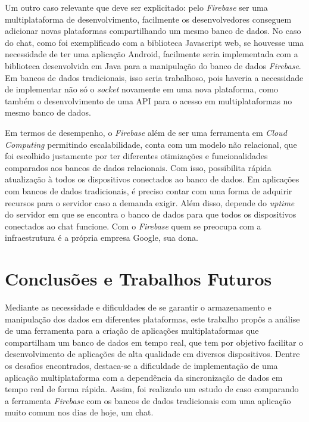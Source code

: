 \documentclass[12pt]{article}
\begin{document}
Um outro caso relevante que deve ser explicitado: pelo \textit{Firebase} ser uma multiplataforma de desenvolvimento, facilmente os desenvolvedores conseguem adicionar novas plataformas compartilhando um mesmo banco de dados. No caso do chat, como foi exemplificado com a biblioteca Javascript web, se houvesse uma necessidade de ter uma aplicação Android, facilmente seria implementada com a biblioteca desenvolvida em Java para a manipulação do banco de dados \textit{Firebase}. Em bancos de dados tradicionais, isso seria trabalhoso, pois haveria a necessidade de implementar não só o \textit{socket} novamente em uma nova plataforma, como também o desenvolvimento de uma API para o acesso em multiplataformas no mesmo banco de dados.

Em termos de desempenho, o \textit{Firebase} além de ser uma ferramenta em \textit{Cloud Computing} permitindo escalabilidade, conta com um modelo não relacional, que foi escolhido justamente por ter diferentes otimizações e funcionalidades comparados aos bancos de dados relacionais. Com isso, possibilita rápida atualização à todos os dispositivos conectados ao banco de dados. Em aplicações com bancos de dados tradicionais, é preciso contar com uma forma de adquirir recursos para o servidor caso a demanda exigir. Além disso, depende do \textit{uptime} do servidor em que se encontra o banco de dados para que todos os dispositivos conectados ao chat funcione. Com o \textit{Firebase} quem se preocupa com a infraestrutura é a própria empresa Google, sua dona.


\section{Conclusões e Trabalhos Futuros}
Mediante as necessidade e dificuldades de se garantir o armazenamento e manipulação dos dados em diferentes plataformas, este trabalho propôs a análise de uma ferramenta para a criação de aplicações multiplataformas que compartilham um banco de dados em tempo real, que tem por objetivo facilitar o desenvolvimento de aplicações de alta qualidade em diversos dispositivos. Dentre os desafios encontrados, destaca-se a dificuldade de implementação de uma aplicação multiplataforma com a dependência da sincronização de dados em tempo real de forma rápida. Assim, foi realizado um estudo de caso comparando a ferramenta \textit{Firebase} com os bancos de dados tradicionais com uma aplicação muito comum nos dias de hoje, um chat. 
\end{document}
